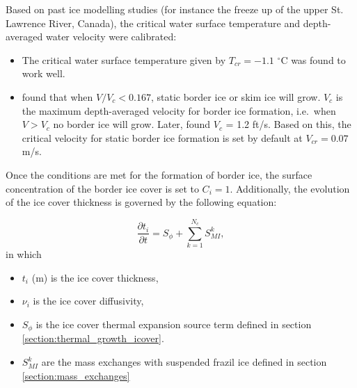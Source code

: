 \renewcommand{\labelitemi}{\textbullet}
Based on past ice modelling studies (for instance the freeze up of the upper St. Lawrence River, Canada), the critical water surface temperature and depth-averaged water velocity were calibrated:
\begin{itemize}
    \item The critical water surface temperature given by \cite{matousek1984types} $T_{cr} = -1.1$ $^{\circ}$C was found to work well.
    \item \cite{michel1982formation} found that when $V/V_c < 0.167$, static border ice or skim ice will grow. $V_c$ is the maximum depth-averaged velocity for border ice formation, i.e.\ when $V>V_c$ no border ice will grow.\newline
    Later, \cite{shen1984field} found $V_c$ = 1.2 ft/s. Based on this, the critical velocity for static border ice formation is set by default at $V_{cr} = 0.07$ m/s.
\end{itemize}
\renewcommand{\labelitemi}{$\triangleright$}

Once the conditions are met for the formation of border ice, the surface concentration of the border ice cover is set to $C_i =1$. Additionally, the evolution of the ice cover thickness is governed by the following equation:

\begin{equation}
  \frac{\partial t_i}{\partial t} = S_{\phi} + \sum_{k=1}^{N_c} S_{MI}^k,
\end{equation}
in which
\begin{itemize}
\item $t_i$ (m) is the ice cover thickness,
\item $\nu_i$ is the ice cover diffusivity,
\item $S_{\phi}$ is the ice cover thermal expansion source term defined in section \ref{section:thermal_growth_icover}.
\item $S_{MI}^k$ are the mass exchanges with suspended frazil ice defined in section \ref{section:mass_exchanges}
\end{itemize}




